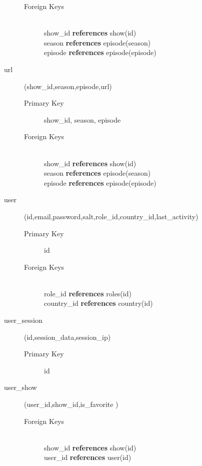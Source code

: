 \begin{description}
\begin{description}
			\item[Foreign Keys] \hfill \\ show\_id \textbf{references} show(id) \hfill \\ season \textbf{references} episode(season) \hfill \\ episode \textbf{references} episode(episode)
		\end{description}
	\item[url] (show\_id,season,episode,url)
		\begin{description}
			\item[Primary Key] show\_id, season, episode
			\item[Foreign Keys] \hfill \\ show\_id \textbf{references} show(id) \hfill \\ season \textbf{references} episode(season) \hfill \\ episode \textbf{references} episode(episode)
		\end{description}
	\item[user] (id,email,password,salt,role\_id,country\_id,last\_activity)
		\begin{description}
			\item[Primary Key] id
			\item[Foreign Keys] \hfill \\ role\_id \textbf{references} roles(id) \hfill \\ country\_id \textbf{references} country(id)
		\end{description}
	\item[user\_session] (id,session\_data,session\_ip)
		\begin{description}
			\item[Primary Key] id
		\end{description}
	\item[user\_show] (user\_id,show\_id,is\_favorite  )
		\begin{description}
			\item[Foreign Keys] \hfill \\ show\_id \textbf{references} show(id) \hfill \\ user\_id \textbf{references} user(id)
		\end{description}
	
\end{description}
	
